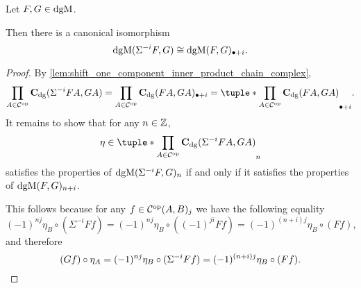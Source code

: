 \begin{lemma}
    \label{lem:dgmod_shift_eq_plus}
    Let \( F, G \in \operatorname{dgM} \).

    Then there is a canonical isomorphism
    \[
        \operatorname{dgM}(\Sigma^{-i} F, G) \cong \operatorname{dgM}(F, G)_{\bullet + i}.
    \]
\end{lemma}
\begin{proof}
    By \autoref{lem:shift_one_component_inner_product_chain_complex},
    \[
        \prod_{A \in \Cc^{\op}} \C_{\dg}(\Sigma^{-i} F A, G A) = \prod_{A \in \Cc^{\op}} \C_{\dg}(F A, G A)_{\bullet+i} = \tuple*{\prod_{A \in \Cc^{\op}} \C_{\dg}(F A, G A)}_{\bullet+i}.
    \]
    It remains to show that for any \( n \in {\mathbb{Z}} \),
    \[
        \eta \in \tuple*{\prod_{A \in \Cc^{\op}} \C_{\dg}(\Sigma^{-i} F A, G A)}_n
    \]
    satisfies the properties of \( \operatorname{dgM}(\Sigma^{-i} F, G)_n \) if and only if it satisfies the properties of \( \operatorname{dgM}(F, G)_{n + i} \).

    This follows because for any \( f \in {\mathcal{C}}^{\operatorname{op}}(A, B)_j \) we have the following equality
    \[
        (-1)^{nj} \eta_B \circ (\Sigma^{-i} F f) = (-1)^{nj} \eta_B \circ ((-1)^{ji}F f) = (-1)^{(n + i)j}\eta_B \circ (F f),
    \]
    and therefore
    \[
        (G f) \circ \eta_A = (-1)^{nj} \eta_B \circ (\Sigma^{-i} F f) = (-1)^{(n + i)j}\eta_B \circ (F f). \qedhere
    \]
\end{proof}



